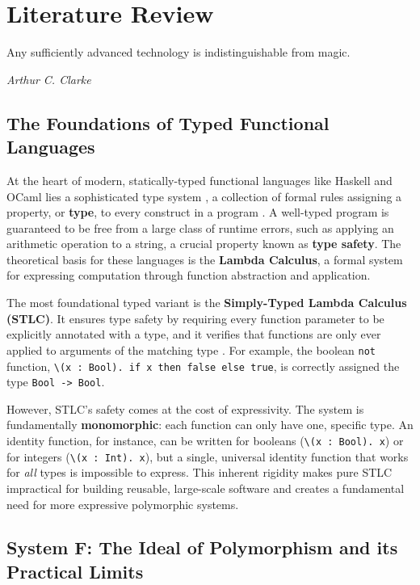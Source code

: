 \chapter{Literature Review}
\label{chap:LiteratureReview}

\epigraph{Any sufficiently advanced technology is indistinguishable from magic.}{\textit{Arthur C. Clarke}}

\section{The Foundations of Typed Functional Languages}
\label{sec:LitReviewFoundations}

At the heart of modern, statically-typed functional languages like Haskell and OCaml lies a sophisticated type system \cite{haskell-type-systems-research, ocaml-papers}, a collection of formal rules assigning a property, or \textbf{type}, to every construct in a program \cite{pierce-types-2002}. A well-typed program is guaranteed to be free from a large class of runtime errors, such as applying an arithmetic operation to a string, a crucial property known as \textbf{type safety}. The theoretical basis for these languages is the \textbf{Lambda Calculus}, a formal system for expressing computation through function abstraction and application.

The most foundational typed variant is the \textbf{Simply-Typed Lambda Calculus (STLC)}. It ensures type safety by requiring every function parameter to be explicitly annotated with a type, and it verifies that functions are only ever applied to arguments of the matching type \cite{Pierce-SF2}. For example, the boolean \texttt{not} function, \texttt{\textbackslash(x : Bool). if x then false else true}, is correctly assigned the type \texttt{Bool -> Bool}.

However, STLC's safety comes at the cost of expressivity. The system is fundamentally \textbf{monomorphic}: each function can only have one, specific type. An identity function, for instance, can be written for booleans (\texttt{\textbackslash(x~:~Bool).~x}) or for integers (\texttt{\textbackslash(x~:~Int).~x}), but a single, universal identity function that works for \textit{all} types is impossible to express. This inherent rigidity makes pure STLC impractical for building reusable, large-scale software and creates a fundamental need for more expressive polymorphic systems.

\section{System F: The Ideal of Polymorphism and its Practical Limits}
\label{chap:LiteratureReview:sec:PolymorphismAndSystemF}

